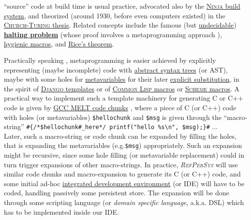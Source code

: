 \documentclass[11pt,a4paper,svgnames]{article}
\newcommand{\RefPerSys}{{\textit{\textsc{RefPerSys}}}}
\begin{document}
``source'' code at build time is usual practice, advocated also by the
\href{https://ninja-build.org/}{\textsc{Ninja} build system}, and
theorized (around 1930, before even computers existed) in the
\href{https://en.wikipedia.org/wiki/Church-Turing_thesis}{\textsc{Church-Turing}
  thesis}. Related concepts include the famous (but
\href{https://en.wikipedia.org/wiki/Undecidable_problem}{undecidable})
\href{https://en.wikipedia.org/wiki/Halting_problem}{\textbf{halting
    problem}} (whose proof involves a metaprogramming approach
\cite{Hofstadter:1979:GEB}),
\href{https://en.wikipedia.org/wiki/Hygienic_macro}{hygienic macros},
and \href{https://en.wikipedia.org/wiki/Rice's_theorem}{Rice's
  theorem}.

Practically speaking \cite{abelson:1996:sicp}, metaprogramming is
easier achieved by explicitly representing (maybe incomplete) code
with
\href{https://en.wikipedia.org/wiki/Abstract_syntax_tree}{abstract
  syntax trees}   (or  AST), maybe with some holes for
\href{https://en.wikipedia.org/wiki/Metavariable}{metavariables} for
their later
\href{https://en.wikipedia.org/wiki/Explicit_substitution}{explicit
  substitution}, in the spirit of
\href{https://docs.djangoproject.com/en/2.2/topics/templates/}{\textsc{Django}
  templates} or of
\href{https://lispcookbook.github.io/cl-cookbook/macros.html}{\textsc{Common
    Lisp} macros} or
\href{https://en.wikibooks.org/wiki/Scheme_Programming/Macros}{\textsc{Scheme}
  macros}. A practical way to implement such a template machinery for
generating C or C++ code is given by
\href{https://gcc.gnu.org/wiki/MELT tutorial}{\textsc{GCC MELT} code
  chunks} \cite{Starynkevitch-DSL2011, Starynkevitch-GCCMELTweb,
  Starynkevitch:2009:grow, Starynkevitch:2007:Multistage}, where a
piece of C (or C++) code with holes (or metavariables)
\texttt{\$hellochunk} and \texttt{\$msg} is given through the
``macro-string''
\verb!#{/*$hellochunk#_here*/ printf("hello %s\n", $msg);}#! ... \\
Later, such a macro-string or code chunk can be expanded by filling
the holes, that is expanding the metavariables (e.g.\texttt{\$msg})
appropriately. Such an expansion might be recursive, since some hole
filling (or metavariable replacement) could in turn trigger expansions
of other macro-strings. In practice, {\RefPerSys} will use similar
code chunks and macro-expansion to generate its C (or C++) code, and
some initial ad-hoc
\href{https://en.wikipedia.org/wiki/Integrated_development_environment}{integrated
  development environment} 
(or  IDE) will have to be coded, handling passively some
persistent store. The expansion will be done through some scripting
language (or \emph{domain specific language}, a.k.a. DSL) which has to
be implemented inside our IDE.
\end{document}
